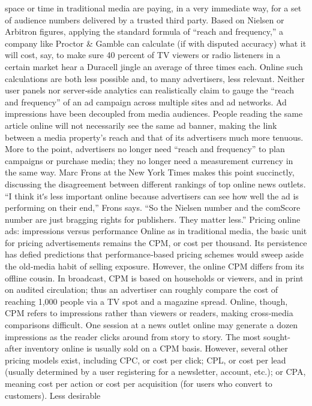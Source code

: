 space or time in traditional media are paying, in a very immediate way,
for a set of audience numbers delivered by a trusted third party. Based on
Nielsen or Arbitron figures, applying the standard formula of ``reach and
frequency,'' a company like Proctor & Gamble can calculate (if with
disputed accuracy) what it will cost, say, to make sure 40 percent of TV
viewers or radio listeners in a certain market hear a Duracell jingle an
average of three times each.
Online such calculations are both less possible and, to many advertisers,
less relevant. Neither user panels nor server‐side analytics can realistically
claim to gauge the ``reach and frequency'' of an ad campaign across
multiple sites and ad networks. Ad impressions have been decoupled
from media audiences. People reading the same article online will not
necessarily see the same ad banner, making the link between a media
property’s reach and that of its advertisers much more tenuous. More to
the point, advertisers no longer need ``reach and frequency'' to plan
campaigns or purchase media; they no longer need a measurement
currency in the same way.
Marc Frons at the New York Times makes this point succinctly, discussing
the disagreement between different rankings of top online news outlets. ``I
think itʹs less important online because advertisers can see how well the
ad is performing on their end,'' Frons says. ``So the Nielsen number and
the comScore number are just bragging rights for publishers. They matter
less.''
Pricing online ads: impressions versus performance
Online as in traditional media, the basic unit for pricing advertisements
remains the CPM, or cost per thousand. Its persistence has defied
predictions that performance‐based pricing schemes would sweep aside
the old‐media habit of selling exposure.
However, the online CPM differs from its offline cousin. In broadcast,
CPM is based on households or viewers, and in print on audited
circulation; thus an advertiser can roughly compare the cost of reaching
1,000 people via a TV spot and a magazine spread. Online, though, CPM
refers to impressions rather than viewers or readers, making cross‐media
comparisons difficult. One session at a news outlet online may generate a
dozen impressions as the reader clicks around from story to story.
The most sought‐after inventory online is usually sold on a CPM basis.
However, several other pricing models exist, including CPC, or cost
per click; CPL, or cost per lead (usually determined by a user registering
for a newsletter, account, etc.); or CPA, meaning cost per action or cost
per acquisition (for users who convert to customers). Less desirable
